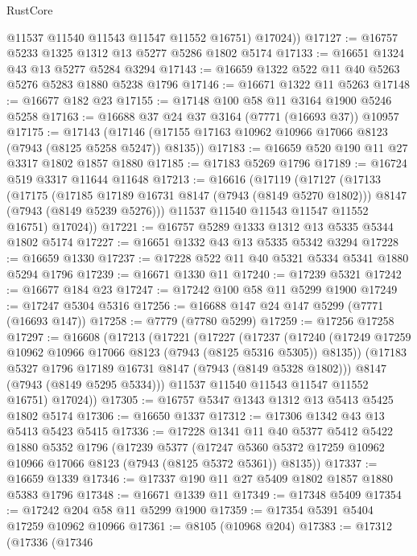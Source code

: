 \begin{lexlean}{RustCore}
\begin{coremodule}
          @11537
          @11540
          @11543
          @11547
          @11552
          @16751)
        @17024))
@17127 := @16757 @5233 @1325 @1312 @13 @5277 @5286 @1802 @5174
@17133 := @16651 @1324 @43 @13 @5277 @5284 @3294
@17143 := @16659 @1322 @522 @11 @40 @5263 @5276 @5283 @1880 @5238 @1796
@17146 := @16671 @1322 @11 @5263
@17148 := @16677 @182 @23
@17155 := @17148 @100 @58 @11 @3164 @1900 @5246 @5258
@17163 := @16688 @37 @24 @37 @3164 (@7771 (@16693 @37)) @10957
@17175 := @17143
    (@17146 (@17155 @17163 @10962 @10966 @17066 @8123 (@7943 (@8125 @5258 @5247)) @8135))
@17183 := @16659 @520 @190 @11 @27 @3317 @1802 @1857 @1880
@17185 := @17183 @5269 @1796
@17189 := @16724 @519 @3317 @11644 @11648
@17213 := @16616
    (@17119
      (@17127
        (@17133
          (@17175
            (@17185 @17189 @16731 @8147 (@7943 (@8149 @5270 @1802)))
            @8147
            (@7943 (@8149 @5239 @5276)))
          @11537
          @11540
          @11543
          @11547
          @11552
          @16751)
        @17024))
@17221 := @16757 @5289 @1333 @1312 @13 @5335 @5344 @1802 @5174
@17227 := @16651 @1332 @43 @13 @5335 @5342 @3294
@17228 := @16659 @1330
@17237 := @17228 @522 @11 @40 @5321 @5334 @5341 @1880 @5294 @1796
@17239 := @16671 @1330 @11
@17240 := @17239 @5321
@17242 := @16677 @184 @23
@17247 := @17242 @100 @58 @11 @5299 @1900
@17249 := @17247 @5304 @5316
@17256 := @16688 @147 @24 @147 @5299 (@7771 (@16693 @147))
@17258 := @7779 (@7780 @5299)
@17259 := @17256 @17258
@17297 := @16608
    (@17213
      (@17221
        (@17227
          (@17237
            (@17240 (@17249 @17259 @10962 @10966 @17066 @8123 (@7943 (@8125 @5316 @5305)) @8135))
            (@17183 @5327 @1796 @17189 @16731 @8147 (@7943 (@8149 @5328 @1802)))
            @8147
            (@7943 (@8149 @5295 @5334)))
          @11537
          @11540
          @11543
          @11547
          @11552
          @16751)
        @17024))
@17305 := @16757 @5347 @1343 @1312 @13 @5413 @5425 @1802 @5174
@17306 := @16650 @1337
@17312 := @17306 @1342 @43 @13 @5413 @5423 @5415
@17336 := @17228
    @1341
    @11
    @40
    @5377
    @5412
    @5422
    @1880
    @5352
    @1796
    (@17239
      @5377
      (@17247 @5360 @5372 @17259 @10962 @10966 @17066 @8123 (@7943 (@8125 @5372 @5361)) @8135))
@17337 := @16659 @1339
@17346 := @17337 @190 @11 @27 @5409 @1802 @1857 @1880 @5383 @1796
@17348 := @16671 @1339 @11
@17349 := @17348 @5409
@17354 := @17242 @204 @58 @11 @5299 @1900
@17359 := @17354 @5391 @5404 @17259 @10962 @10966
@17361 := @8105 (@10968 @204)
@17383 := @17312
    (@17336
      (@17346

\end{coremodule}
\end{lexlean}
